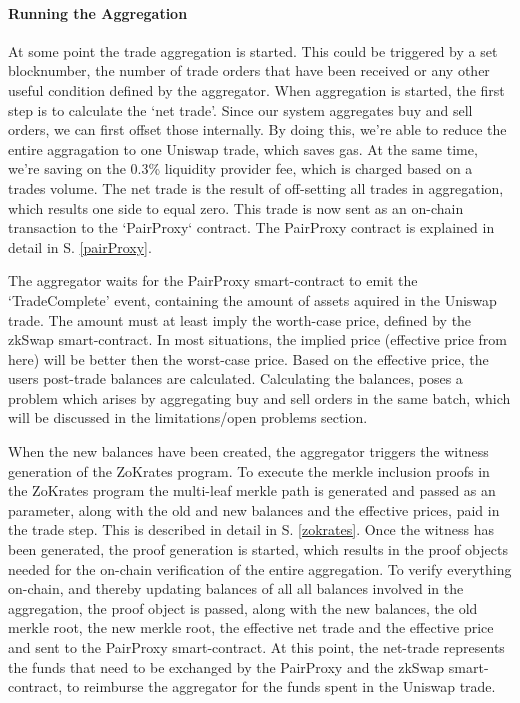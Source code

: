\documentclass[../../thesis.tex]{subfiles}
\begin{document}
\paragraph{Running the Aggregation}
At some point the trade aggregation is started. This could be triggered by a set blocknumber, the number of trade orders that have been received or any other useful condition defined by the aggregator. When aggregation is started, the first step is to calculate the `net trade'. Since our system aggregates buy and sell orders, we can first offset those internally. By doing this, we're able to reduce the entire aggragation to one Uniswap trade, which saves gas. At the same time, we're saving on the 0.3\% liquidity provider fee, which is charged based on a trades volume. The net trade is the result of off-setting all trades in aggregation, which results one side to equal zero. This trade is now sent as an on-chain transaction to the `PairProxy` contract. The PairProxy contract is explained in detail in S. \ref{pairProxy}. 

The aggregator waits for the PairProxy smart-contract to emit the `TradeComplete' event, containing the amount of assets aquired in the Uniswap trade. The amount must at least imply the worth-case price, defined by the zkSwap smart-contract. In most situations, the implied price (effective price from here) will be better then the worst-case price. Based on the effective price, the users post-trade balances are calculated. Calculating the balances, poses a problem which arises by aggregating buy and sell orders in the same batch, which will be discussed in the limitations/open problems section. 

When the new balances have been created, the aggregator triggers the witness generation of the ZoKrates program. To execute the merkle inclusion proofs in the ZoKrates program the multi-leaf merkle path is generated and passed as an parameter, along with the old and new balances and the effective prices, paid in the trade step. This is described in detail in S. \ref{zokrates}. Once the witness has been generated, the proof generation is started, which results in the proof objects needed for the on-chain verification of the entire aggregation. To verify everything on-chain, and thereby updating balances of all all balances involved in the aggregation, the proof object is passed, along with the new balances, the old merkle root, the new merkle root, the effective net trade and the effective price and sent to the PairProxy smart-contract. At this point, the net-trade represents the funds that need to be exchanged by the PairProxy and the zkSwap smart-contract, to reimburse the aggregator for the funds spent in the Uniswap trade. 
\end{document}
